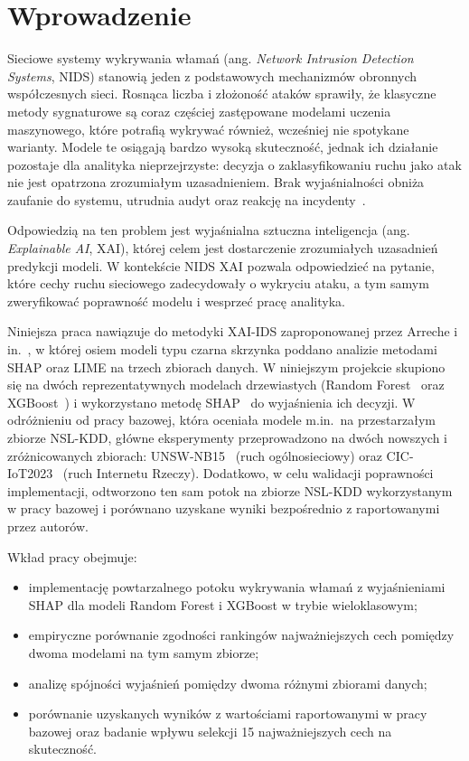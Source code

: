 \documentclass[conference]{IEEEtran}
\begin{document}
\section{Wprowadzenie}
Sieciowe systemy wykrywania włamań (ang. \emph{Network Intrusion Detection Systems}, NIDS) stanowią jeden z podstawowych mechanizmów obronnych współczesnych sieci. Rosnąca liczba i złożoność ataków sprawiły, że klasyczne metody sygnaturowe są coraz częściej zastępowane modelami uczenia maszynowego, które potrafią wykrywać również, wcześniej nie spotykane warianty. Modele te osiągają bardzo wysoką skuteczność, jednak ich działanie pozostaje dla analityka nieprzejrzyste: decyzja o zaklasyfikowaniu ruchu jako atak nie jest opatrzona zrozumiałym uzasadnieniem. Brak wyjaśnialności obniża zaufanie do systemu, utrudnia audyt oraz reakcję na incydenty~\cite{arreche2024xaiids}.

Odpowiedzią na ten problem jest wyjaśnialna sztuczna inteligencja (ang. \emph{Explainable AI}, XAI), której celem jest dostarczenie zrozumiałych uzasadnień predykcji modeli. W kontekście NIDS XAI pozwala odpowiedzieć na pytanie, które cechy ruchu sieciowego zadecydowały o wykryciu ataku, a tym samym zweryfikować poprawność modelu i wesprzeć pracę analityka.

Niniejsza praca nawiązuje do metodyki XAI-IDS zaproponowanej przez Arreche i in.~\cite{arreche2024xaiids}, w której osiem modeli typu czarna skrzynka poddano analizie metodami SHAP oraz LIME na trzech zbiorach danych. W niniejszym projekcie skupiono się na dwóch reprezentatywnych modelach drzewiastych (Random Forest~\cite{breiman2001rf} oraz XGBoost~\cite{chen2016xgboost}) i wykorzystano metodę SHAP~\cite{lundberg2017shap,lundberg2020treeshap} do wyjaśnienia ich decyzji. W odróżnieniu od pracy bazowej, która oceniała modele m.in.\ na przestarzałym zbiorze NSL-KDD, główne eksperymenty przeprowadzono na dwóch nowszych i zróżnicowanych zbiorach: UNSW-NB15~\cite{moustafa2015unsw} (ruch ogólnosieciowy) oraz CIC-IoT2023~\cite{neto2023ciciot} (ruch Internetu Rzeczy). Dodatkowo, w celu walidacji poprawności implementacji, odtworzono ten sam potok na zbiorze NSL-KDD wykorzystanym w pracy bazowej i porównano uzyskane wyniki bezpośrednio z raportowanymi przez autorów.

Wkład pracy obejmuje:
\begin{itemize}
\item implementację powtarzalnego potoku wykrywania włamań z wyjaśnieniami SHAP dla modeli Random Forest i XGBoost w trybie wieloklasowym;
\item empiryczne porównanie zgodności rankingów najważniejszych cech pomiędzy dwoma modelami na tym samym zbiorze;
\item analizę spójności wyjaśnień pomiędzy dwoma różnymi zbiorami danych;
\item porównanie uzyskanych wyników z wartościami raportowanymi w pracy bazowej oraz badanie wpływu selekcji 15 najważniejszych cech na skuteczność.
\end{itemize}
\end{document}
